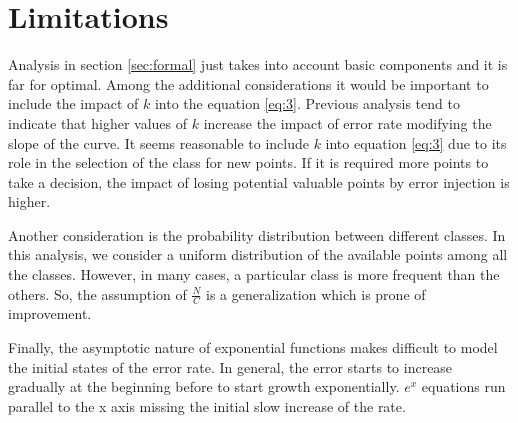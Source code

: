 \documentclass{article}
\begin{document}
\section{Limitations}
Analysis in section \ref{sec:formal} just takes into account basic components and it is far for optimal.  Among the additional considerations it would be important to include the impact of $k$ into the equation \ref{eq:3}.  Previous analysis tend to indicate that higher values of $k$ increase the impact of error rate modifying the slope of the curve.  It seems reasonable to include $k$ into equation \ref{eq:3} due to its role in the selection of the class for new points.  If it is required more points to take a decision, the impact of losing potential valuable points by error injection is higher.

Another consideration is the probability distribution between different classes. In this analysis, we consider a uniform distribution of the available points among all the classes.  However, in many cases, a particular class is more frequent than the others. So, the assumption of $\frac{N}{C}$ is a generalization which is prone of improvement.

Finally, the asymptotic nature of exponential functions makes difficult to model the initial states of the error rate.  In general, the error starts to increase gradually at the beginning before to start growth exponentially. $e^x$ equations run parallel to the x axis missing the initial slow increase of the rate.
\end{document}
